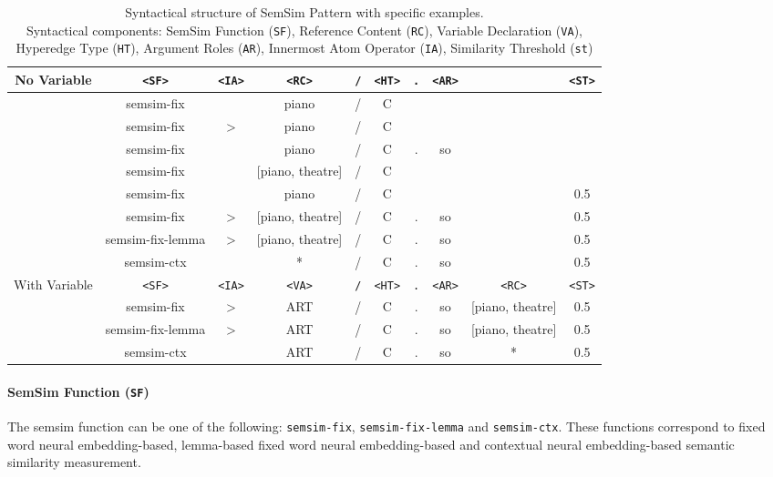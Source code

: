 \documentclass[11pt]{scrreprt}
\begin{document}
\begin{table*}[h!]
\centering
\normalfont\sffamily
\setlength{\tabcolsep}{0pt}
\begin{tabular}{c@{\hspace{20pt}}ccccccccc}
\toprule
\textrm{No Variable}   & \texttt{<SF>} & \texttt{<IA>} & \texttt{<RC>} & \texttt{/} & \texttt{<HT>} & \texttt{.} & \texttt{<AR>} &  & \texttt{<ST>} \\
\midrule
\multirow{5}{*}{}
 & semsim-fix & & piano & / & C &  &   & & \\
 & semsim-fix & > & piano & / & C &  &   & & \\
 & semsim-fix & & piano & / & C & . & so & & \\
 & semsim-fix & & [piano, theatre] & / & C &  &   & & \\
 & semsim-fix & & piano & / & C &  &   & & 0.5 \\
 & semsim-fix & > & [piano, theatre] & / & C & . & so & & 0.5 \\
 & semsim-fix-lemma & > & [piano, theatre] & / & C & . & so & & 0.5 \\
 & semsim-ctx &  & * & / & C & . & so & & 0.5 \\
\midrule
\midrule
\textrm{With Variable} & \texttt{<SF>} & \texttt{<IA>} & \texttt{<VA>} & \texttt{/} & \texttt{<HT>} & \texttt{.} & \texttt{<AR>} & \texttt{<RC>} & \texttt{<ST>} \\
\midrule
 & semsim-fix & > & ART & / & C & . & so & [piano, theatre] & 0.5\\
 & semsim-fix-lemma & > & ART & / & C & . & so & [piano, theatre] & 0.5\\
 & semsim-ctx &  & ART & / & C & . & so & * & 0.5 \\
\bottomrule
\end{tabular}
\caption{
Syntactical structure of SemSim Pattern with specific examples.\\
Syntactical components: SemSim Function (\texttt{SF}), Reference Content (\texttt{RC}),  Variable Declaration (\texttt{VA}), Hyperedge Type (\texttt{HT}), Argument Roles (\texttt{AR}), Innermost Atom Operator (\texttt{IA}), Similarity Threshold (\texttt{\gls{st}})
}
\label{tab:semsim-pattern}
\end{table*}


\paragraph{SemSim Function (\texttt{SF})}
 The semsim function can be one of the following: \texttt{semsim-fix}, \texttt{semsim-fix-lemma} and \texttt{semsim-ctx}. These functions correspond to fixed word neural embedding-based, lemma-based fixed word neural embedding-based and contextual neural embedding-based semantic similarity measurement.
\end{document}
